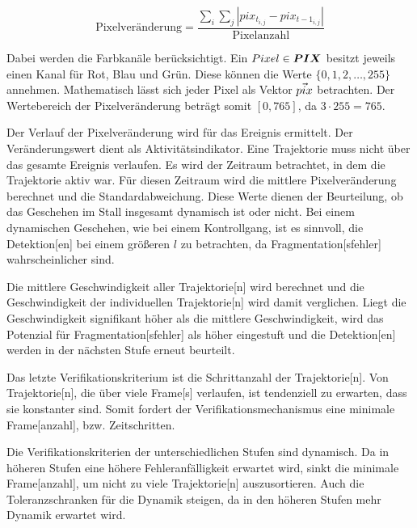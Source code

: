 \begin{equation}
\text{Pixelveränderung} = \frac{\sum_i \sum_j |pix_{t_{i,j}} - pix_{{t-1}_{i,j}}|}{\text{Pixelanzahl}}
\label{eq:Pixelveränderung}
\end{equation}

Dabei werden die Farbkanäle berücksichtigt. Ein \(Pixel \in \boldsymbol{PIX}\) besitzt jeweils einen Kanal für Rot, Blau und Grün. Diese können die Werte \(\{0,1,2, \dots, 255\}\) annehmen. Mathematisch lässt sich jeder Pixel als Vektor \(\vec{pix}\) betrachten. Der Wertebereich der Pixelveränderung beträgt somit \([0, 765]\), da \(3 \cdot 255 = 765\). \par

Der Verlauf der Pixelveränderung wird für das Ereignis ermittelt. Der Veränderungswert dient als Aktivitätsindikator. Eine \gls{Trajektorie} muss nicht über das gesamte Ereignis verlaufen. Es wird der Zeitraum betrachtet, in dem die \gls{Trajektorie} aktiv war. Für diesen Zeitraum wird die mittlere Pixelveränderung berechnet und die Standardabweichung. Diese Werte dienen der Beurteilung, ob das Geschehen im Stall insgesamt dynamisch ist oder nicht. Bei einem dynamischen Geschehen, wie bei einem Kontrollgang, ist es sinnvoll, die \gls{Detektion}[en] bei einem größeren \(l\) zu betrachten, da \gls{Fragmentation}[sfehler] wahrscheinlicher sind. \par

Die mittlere Geschwindigkeit aller \gls{Trajektorie}[n] wird berechnet und die Geschwindigkeit der individuellen \gls{Trajektorie}[n] wird damit verglichen. Liegt die Geschwindigkeit signifikant höher als die mittlere Geschwindigkeit, wird das Potenzial für \gls{Fragmentation}[sfehler] als höher eingestuft und die \gls{Detektion}[en] werden in der nächsten Stufe erneut beurteilt. \par

Das letzte Verifikationskriterium ist die Schrittanzahl der \gls{Trajektorie}[n]. Von \gls{Trajektorie}[n], die über viele \gls{Frame}[s] verlaufen, ist tendenziell zu erwarten, dass sie konstanter sind. Somit fordert der Verifikationsmechanismus eine minimale \gls{Frame}[anzahl], bzw. Zeitschritten.\par

Die Verifikationskriterien der unterschiedlichen Stufen sind dynamisch. Da in höheren Stufen eine höhere Fehleranfälligkeit erwartet wird, sinkt die minimale \gls{Frame}[anzahl], um nicht zu viele \gls{Trajektorie}[n] auszusortieren. Auch die Toleranzschranken für die Dynamik steigen, da in den höheren Stufen mehr Dynamik erwartet wird. \par



